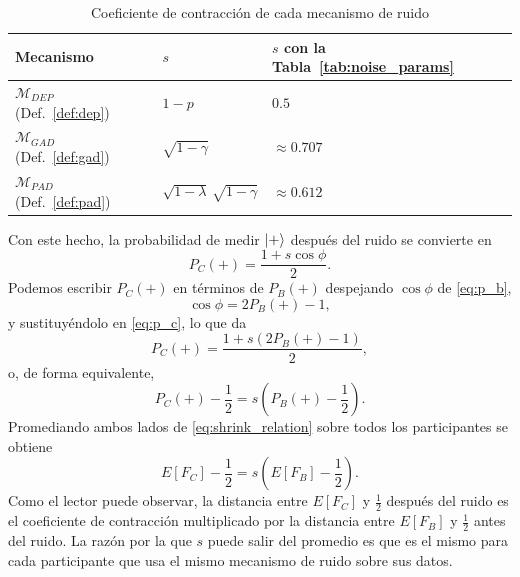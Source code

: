 \documentclass{ieeeaccess}
\begin{document}
\begin{table}[H]
  \caption{Coeficiente de contracción de cada mecanismo de ruido}
  \label{tab:shrinking_coefficient}
  \centering
  \begin{tabular}{lll}
    \toprule
    Mecanismo & $s$ & $s$ con la Tabla~\ref{tab:noise_params} \\
    \midrule
    $\mathcal{M}_{DEP}$ (Def.~\ref{def:dep}) & $1 - p$ & $0.5$ \\
    $\mathcal{M}_{GAD}$ (Def.~\ref{def:gad}) & $\sqrt{1 - \gamma}$ & $\approx 0.707$ \\
    $\mathcal{M}_{PAD}$ (Def.~\ref{def:pad}) & $\sqrt{1 - \lambda}\,\sqrt{1 - \gamma}$ & $\approx 0.612$ \\
    \bottomrule
  \end{tabular}
\end{table}

Con este hecho, la probabilidad de medir $\ket{+}$ después del ruido se convierte en
\begin{equation}
  P_C(+) = \frac{1+s\cos\phi}{2}.
  \label{eq:p_c}
\end{equation}
Podemos escribir $P_C(+)$ en términos de $P_B(+)$ despejando $\cos\phi$ de \eqref{eq:p_b},
\begin{equation}
  \cos\phi = 2P_B(+) - 1,
  \label{eq:cos_phi}
\end{equation}
y sustituyéndolo en \eqref{eq:p_c}, lo que da
\begin{equation}
  P_C(+) = \frac{1+s\left(2P_B(+) - 1\right)}{2},
  \label{eq:p_c_of_p_b}
\end{equation}
o, de forma equivalente,
\begin{equation}
  P_C(+) - \frac{1}{2} = s\left(P_B(+) - \frac{1}{2}\right).
  \label{eq:shrink_relation}
\end{equation}
Promediando ambos lados de \eqref{eq:shrink_relation} sobre todos los participantes se obtiene
\begin{equation}
  E[F_C] - \frac{1}{2} = s\left(E[F_B] - \frac{1}{2}\right).
  \label{eq:expected_shrink}
\end{equation}
Como el lector puede observar, la distancia entre $E[F_C]$ y $\frac{1}{2}$ después del ruido es el coeficiente de contracción multiplicado por la distancia entre $E[F_B]$ y $\frac{1}{2}$ antes del ruido. La razón por la que $s$ puede salir del promedio es que es el mismo para cada participante que usa el mismo mecanismo de ruido sobre sus datos.
\end{document}
